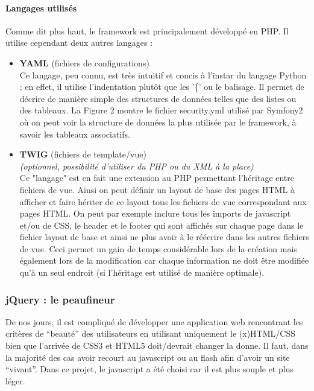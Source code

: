\documentclass{article}
\begin{document}
\begin{sffamily}
\paragraph{Langages utilisés}
Comme dit plus haut, le framework est principalement développé en PHP. Il utilise cependant deux autres langages :
\begin{itemize}
\item \textbf{YAML} (fichiers de configurations)\\
Ce langage, peu connu, est très intuitif et concis à l'instar du langage Python ; en effet, il utilise l'indentation plutôt que les '\{' ou le balisage. Il permet de décrire 
de manière simple des structures de données telles que des listes ou des tableaux. La Figure 2 montre le fichier security.yml utilisé par Symfony2 où on peut voir la 
structure de données la plus utilisée par le framework, à savoir les tableaux associatifs.
\item \textbf{TWIG} (fichiers de template/vue)\\
\textit{(optionnel, possibilité d'utiliser du PHP ou du XML à la place)}\\
Ce "langage" est en fait une extension au PHP permettant l'héritage entre fichiers de vue. Ainsi on peut définir un layout de base des pages HTML à afficher et faire hériter 
de ce layout tous les fichiers de vue correspondant aux pages HTML. On peut par exemple inclure tous les imports de javascript et/ou de CSS, le header et le footer qui sont 
affichés sur chaque page dans le fichier layout de base et ainsi ne plus avoir à le réécrire dans les autres fichiers de vue. Ceci permet un gain de temps considérable lors 
de la création mais également lors de la modification car chaque information ne doit être modifiée qu'à un seul endroit (si l'héritage est utilisé de manière optimale).
\end{itemize}

\subsubsection{jQuery : le peaufineur}

De nos jours, il est compliqué de développer une application web rencontrant les critères de ``beauté'' des utilisateurs en utilisant uniquement le (x)HTML/CSS bien que 
l'arrivée de CSS3 et HTML5 doit/devrait changer la donne. Il faut, dans la majorité des cas avoir recourt au javascript ou au flash afin d'avoir un site ``vivant''. Dans ce 
projet, le javascript a été choisi car il est plus souple et plus léger.

\end{sffamily}
\end{document}
